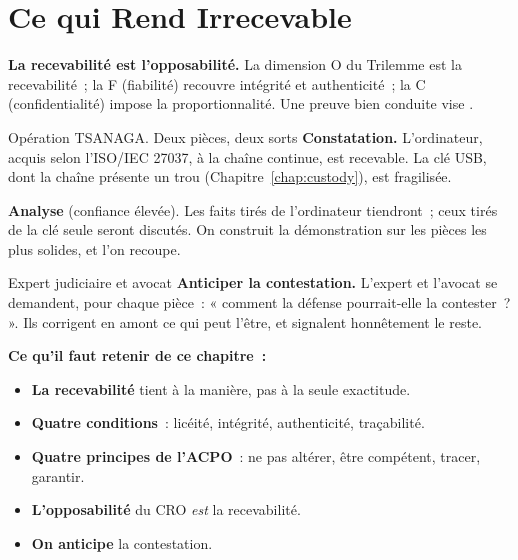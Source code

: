 \section{Ce qui Rend Irrecevable}
\label{sec:c06-irrecevable}

\begin{boxCRO}
\textbf{La recevabilité est l'opposabilité.} La dimension O du Trilemme est la
recevabilité~; la F (fiabilité) recouvre intégrité et authenticité~; la C
(confidentialité) impose la proportionnalité. Une preuve bien conduite vise
.
\end{boxCRO}

\begin{boxscenario}{Opération TSANAGA. Deux pièces, deux sorts}
\textbf{Constatation.} L'ordinateur, acquis selon l'ISO/IEC 27037, à la
chaîne continue, est recevable. La clé USB, dont la chaîne présente un trou
(Chapitre~\ref{chap:custody}), est fragilisée.

\medskip
\textbf{Analyse} (confiance élevée). Les faits tirés de l'ordinateur tiendront~;
ceux tirés de la clé seule seront discutés. On construit la démonstration sur
les pièces les plus solides, et l'on recoupe.
\end{boxscenario}

\begin{boxmetier}{Expert judiciaire et avocat}
\textbf{Anticiper la contestation.} L'expert et l'avocat se demandent, pour
chaque pièce~: « comment la défense pourrait-elle la contester~? ». Ils
corrigent en amont ce qui peut l'être, et signalent honnêtement le reste.
\end{boxmetier}

\separateur

\begin{boxresume}
\textbf{Ce qu'il faut retenir de ce chapitre~:}
\begin{itemize}
    \item \textbf{La recevabilité} tient à la manière, pas à la seule
          exactitude.
    \item \textbf{Quatre conditions}~: licéité, intégrité, authenticité,
          traçabilité.
    \item \textbf{Quatre principes de l'ACPO}~: ne pas altérer, être compétent,
          tracer, garantir.
    \item \textbf{L'opposabilité} du CRO \emph{est} la recevabilité.
    \item \textbf{On anticipe} la contestation.
\end{itemize}
\end{boxresume}

